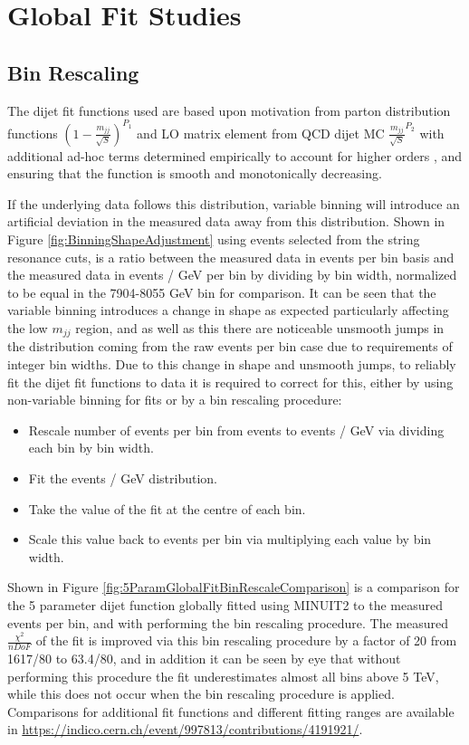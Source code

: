 \section{Global Fit Studies}
\label{sec:globalFitStudies}
\subsection{Bin Rescaling}
\label{subsec:binRescaling_GlobalFitting}
The dijet fit functions used are based upon motivation from parton distribution functions $\left(1-\frac{m_{jj}}{\sqrt{S}}\right)^{P_{1}}$ and LO matrix element from QCD dijet MC $\frac{m_{jj}}{\sqrt{S}}^{P_{2}}$ with additional ad-hoc terms determined empirically to account for higher orders \cite{ATL-COM-PHYS-2018-161}, and ensuring that the function is smooth and monotonically decreasing. 

If the underlying data follows this distribution, variable binning will introduce an artificial deviation in the measured data away from this distribution. Shown in Figure \ref{fig:BinningShapeAdjustment} using events selected from the string resonance cuts, is a ratio between the measured data in events per bin basis and the measured data in events / GeV per bin by dividing by bin width, normalized to be equal in the 7904-8055 GeV bin for comparison. It can be seen that the variable binning introduces a change in shape as expected particularly affecting the low $m_{jj}$ region, and as well as this there are noticeable unsmooth jumps in the distribution coming from the raw events per bin case due to requirements of integer bin widths. Due to this change in shape and unsmooth jumps, to reliably fit the dijet fit functions to data it is required to correct for this, either by using non-variable binning for fits or by a bin rescaling procedure:

\begin{itemize}
    \item Rescale number of events per bin from events to events / GeV via dividing each bin by bin width.
    \item Fit the events / GeV distribution.
    \item Take the value of the fit at the centre of each bin.
    \item Scale this value back to events per bin via multiplying each value by bin width.
\end{itemize}

Shown in Figure \ref{fig:5ParamGlobalFitBinRescaleComparison} is a comparison for the 5 parameter dijet function globally fitted using MINUIT2 to the measured events per bin, and with performing the bin rescaling procedure. The measured $\frac{\chi^{2}}{nDoF}$ of the fit is improved via this bin rescaling procedure by a factor of 20 from 1617/80 to 63.4/80, and in addition it can be seen by eye that without performing this procedure the fit underestimates almost all bins above 5 TeV, while this does not occur when the bin rescaling procedure is applied. Comparisons for additional fit functions and different fitting ranges are available in {\href{https://indico.cern.ch/event/997813/contributions/4191921/attachments/2178521/3679266/dijet_CompareBinRescale_26_01_2021.pdf}{https://indico.cern.ch/event/997813/contributions/4191921/}}.

